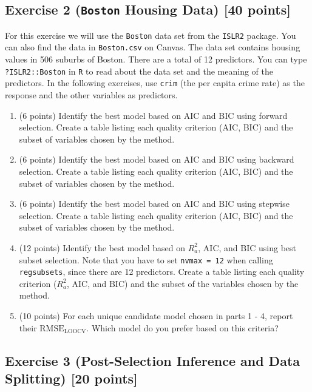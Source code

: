 \documentclass[
]{article}
\begin{document}
\hypertarget{exercise-2-boston-housing-data-40-points}{%
\subsection{\texorpdfstring{Exercise 2 (\texttt{Boston} Housing Data)
{[}40
points{]}}{Exercise 2 (Boston Housing Data) {[}40 points{]}}}\label{exercise-2-boston-housing-data-40-points}}

For this exercise we will use the \texttt{Boston} data set from the
\texttt{ISLR2} package. You can also find the data in
\texttt{Boston.csv} on Canvas. The data set contains housing values in
506 suburbs of Boston. There are a total of 12 predictors. You can type
\texttt{?ISLR2::Boston} in \texttt{R} to read about the data set and the
meaning of the predictors. In the following exercises, use \texttt{crim}
(the per capita crime rate) as the response and the other variables as
predictors.

\begin{enumerate}
\def\labelenumi{\arabic{enumi}.}
\item
  (6 points) Identify the best model based on AIC and BIC using forward
  selection. Create a table listing each quality criterion (AIC, BIC)
  and the subset of variables chosen by the method.
\item
  (6 points) Identify the best model based on AIC and BIC using backward
  selection. Create a table listing each quality criterion (AIC, BIC)
  and the subset of variables chosen by the method.
\item
  (6 points) Identify the best model based on AIC and BIC using stepwise
  selection. Create a table listing each quality criterion (AIC, BIC)
  and the subset of variables chosen by the method.
\item
  (12 points) Identify the best model based on \(R_a^2\), AIC, and BIC
  using best subset selection. Note that you have to set
  \texttt{nvmax\ =\ 12} when calling \texttt{regsubsets}, since there
  are 12 predictors. Create a table listing each quality criterion
  (\(R_a^2\), AIC, and BIC) and the subset of the variables chosen by
  the method.
\item
  (10 points) For each unique candidate model chosen in parts 1 - 4,
  report their \(\text{RMSE}_{\text{LOOCV}}\). Which model do you prefer
  based on this criteria?
\end{enumerate}

\hypertarget{exercise-3-post-selection-inference-and-data-splitting-20-points}{%
\subsection{Exercise 3 (Post-Selection Inference and Data Splitting)
{[}20
points{]}}\label{exercise-3-post-selection-inference-and-data-splitting-20-points}}
\end{document}
